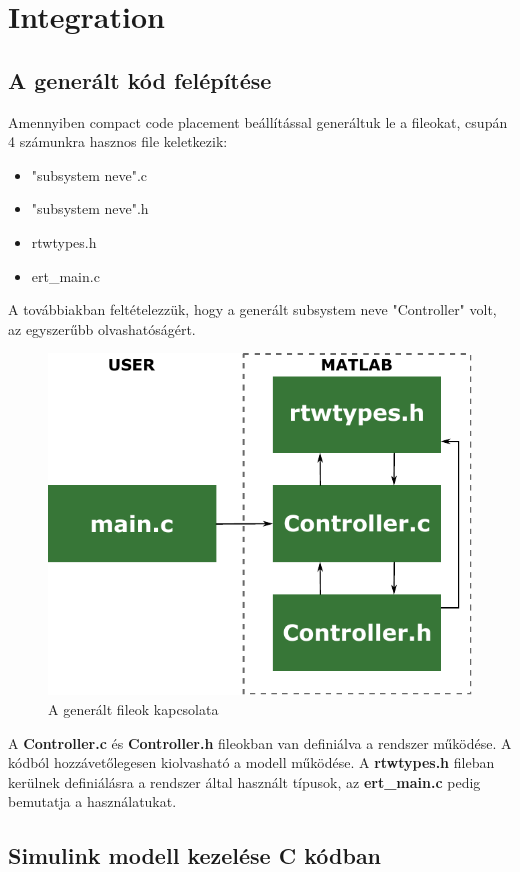 \section{Integration}
\label{sec:integration}

\subsection{A generált kód felépítése}

Amennyiben compact code placement beállítással generáltuk le a fileokat, csupán 4 számunkra hasznos file keletkezik:

\begin{itemize}

    \item "subsystem neve".c
    \item "subsystem neve".h
    \item rtwtypes.h
    \item ert\_main.c

\end{itemize}

A továbbiakban feltételezzük, hogy a generált subsystem neve "Controller" volt, az egyszerűbb olvashatóságért.

\begin{figure}[!ht]
    \centering
    \includegraphics[width=0.6\linewidth]{img/rtw}
    \caption{A generált fileok kapcsolata}
    \label{fig:rtw}
\end{figure}

A \textbf{Controller.c} és \textbf{Controller.h} fileokban van definiálva a rendszer működése. A kódból hozzávetőlegesen kiolvasható a modell működése. A \textbf{rtwtypes.h} fileban kerülnek definiálásra a rendszer által használt típusok, az \textbf{ert\_main.c} pedig bemutatja a használatukat.

\subsection{Simulink modell kezelése C kódban}

